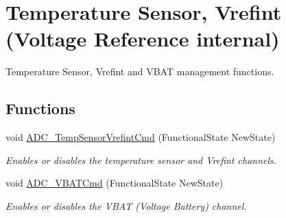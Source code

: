 \hypertarget{group___a_d_c___group3}{\section{Temperature Sensor, Vrefint (Voltage Reference internal)}
\label{group___a_d_c___group3}
}


Temperature Sensor, Vrefint and V\-B\-A\-T management functions.  


\subsection*{Functions}
\begin{DoxyCompactItemize}
\item 
void \hyperlink{group___a_d_c___group3_ga848682e2d7d3de9f8cf03ffa4c11f0b5}{A\-D\-C\-\_\-\-Temp\-Sensor\-Vrefint\-Cmd} (Functional\-State New\-State)
\begin{DoxyCompactList}\small\item\em Enables or disables the temperature sensor and Vrefint channels. \end{DoxyCompactList}\item 
void \hyperlink{group___a_d_c___group3_ga17fc58510ddc80024e65d9738ad6e98c}{A\-D\-C\-\_\-\-V\-B\-A\-T\-Cmd} (Functional\-State New\-State)
\begin{DoxyCompactList}\small\item\em Enables or disables the V\-B\-A\-T (Voltage Battery) channel. \end{DoxyCompactList}\end{DoxyCompactItemize}


